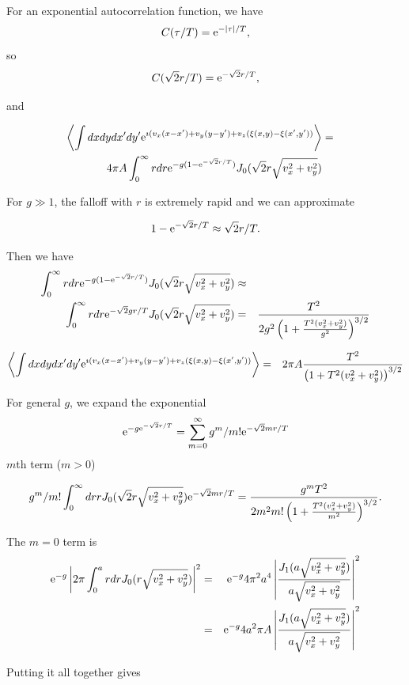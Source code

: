 \documentclass[11pt]{article}
\newcommand{\e}{{\rm e}}
\begin{document}
{{{{For an exponential autocorrelation function, we have
 $$C(\tau/T)=\e^{-|\tau|/T},$$
 so
 $$C(\sqrt{2}r/T)=\e^{-\sqrt{2}r/T},$$

 and
 
 \begin{eqnarray}
\left<\int dx dydx'dy'\e^{\imath( v_{x}(x-x')+v_{y}(y-y')+v_{z}(\xi(x,y)-\xi(x',y'))}\right>&=&\\
4\pi A\int_{0}^{\infty} r dr\e^{-g(1-\e^{-\sqrt{2}r/T})} J_{0}(\sqrt{2}r\sqrt{v_{x}^{2}+v_{y}^{2}})\end{eqnarray}
 
For $g\gg 1$, the falloff with $r$ is extremely rapid and we can approximate

$$1-\e^{-\sqrt{2}r/T}\approx \sqrt{2}r/T.$$

 Then we have
\begin{eqnarray}
\int_{0}^{\infty} r dr\e^{-g(1-\e^{-\sqrt{2}r/T})} J_{0}(\sqrt{2}r\sqrt{v_{x}^{2}+v_{y}^{2}})&\approx&\\
\int_{0}^{\infty} r dr\e^{-\sqrt{2}gr/T} J_{0}(\sqrt{2}r\sqrt{v_{x}^{2}+v_{y}^{2}})&=&
\frac{T^{2}}{2g^{2}\left(1+\frac{T^{2}(v_{x}^{2}+v_{y}^{2})}{g^{2}}\right)^{3/2}}
\end{eqnarray}

 \begin{eqnarray}
\left<\int dx dydx'dy'\e^{\imath( v_{x}(x-x')+v_{y}(y-y')+v_{z}(\xi(x,y)-\xi(x',y'))}\right>&=&
2\pi A\frac{T^{2}}{\left(1+T^{2}(v_{x}^{2}+v_{y}^{2})\right)^{3/2}}
\end{eqnarray}

For general $g$, we expand the exponential
$$\e^{-g\e^{-\sqrt{2}r/T}}=\sum_{m=0}^{\infty}g^{m}/m!\e^{-\sqrt{2}mr/T}$$
$m$th term ($m > 0$)


$$g^{m}/m!\int_{0}^{\infty} dr rJ_{0}(\sqrt{2}r\sqrt{v_{x}^{2}+v_{y}^{2}})\e^{-\sqrt{2}mr/T}= \frac{g^{m}T^{2}}{2m^{2}m!\left(1+\frac{T^{2}(v_{x}^{2}+v_{y}^{2})}{m^{2}}\right)^{3/2}}.$$



The $m=0$  term is
\begin{eqnarray}
\e^{-g} \left|2\pi\int_{0}^{a}r dr J_{0}(r\sqrt{v_{x}^{2}+v_{y}^{2}})\right|^{2}&=&\e^{-g}4\pi^{2}a^{4}\left|\frac{J_{1}(a\sqrt{v_{x}^{2}+v_{y}^{2}})}{a\sqrt{v_{x}^{2}+v_{y}^{2}}}\right|^{2}\\
&=&\e^{-g}4a^{2}\pi A\left|\frac{J_{1}(a\sqrt{v_{x}^{2}+v_{y}^{2}})}{a\sqrt{v_{x}^{2}+v_{y}^{2}}}\right|^{2}\end{eqnarray}

Putting it all together gives

}}}}
\end{document}
